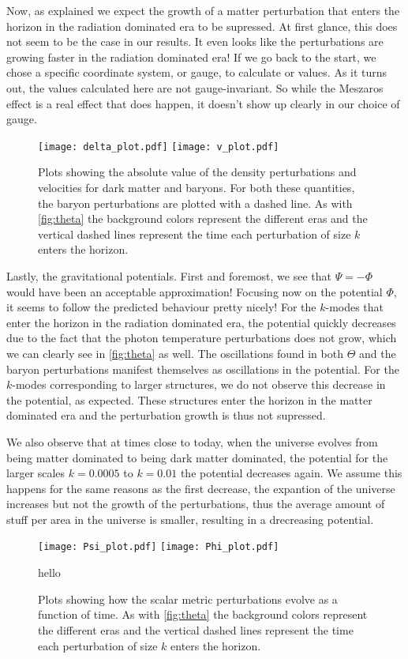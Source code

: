 \documentclass[12pt]{article}
\begin{document}
Now, as explained we expect the growth of a matter perturbation that enters the horizon in the radiation dominated era to be supressed. At first glance, this does not seem to be the case in our results. It even looks like the perturbations are growing faster in the radiation dominated era! If we go back to the start, we chose a specific coordinate system, or gauge, to calculate or values. As it turns out, the values calculated here are not gauge-invariant. So while the Meszaros effect is a real effect that does happen, it doesn't show up clearly in our choice of gauge. 

\begin{figure}[h]
    \centering
    \texttt{[image: delta\_plot.pdf]} 
    \texttt{[image: v\_plot.pdf]} 
    \caption{Plots showing the absolute value of the density perturbations and velocities for dark matter and baryons. For both these quantities, the baryon perturbations are plotted with a dashed line. As with \cref{fig:theta} the background colors represent the different eras and the vertical dashed lines represent the time each perturbation of size $k$ enters the horizon.}
    \label{fig:delta_v}
\end{figure}

Lastly, the gravitational potentials. First and foremost, we see that $\Psi = -\Phi$ would have been an acceptable approximation! Focusing now on the potential $\Phi$, it seems to follow the predicted behaviour pretty nicely! For the $k$-modes that enter the horizon in the radiation dominated era, the potential quickly decreases due to the fact that the photon temperature perturbations does not grow, which we can clearly see in \cref{fig:theta} as well. The oscillations found in both $\Theta$ and the baryon perturbations manifest themselves as oscillations in the potential. For the $k$-modes corresponding to larger structures, we do not observe this decrease in the potential, as expected. These structures enter the horizon in the matter dominated era and the perturbation growth is thus not supressed. 

We also observe that at times close to today, when the universe evolves from being matter dominated to being dark matter dominated, the potential for the larger scales $k=0.0005$ to $k=0.01$ the potential decreases again. We assume this happens for the same reasons as the first decrease, the expantion of the universe increases but not the growth of the perturbations, thus the average amount of stuff per area in the universe is smaller, resulting in a drecreasing potential.

\begin{figure}[h]
    \centering
    \texttt{[image: Psi\_plot.pdf]} 
    \texttt{[image: Phi\_plot.pdf]} 
    \caption{hello}
    \label{fig:phi_psi}
    \caption{Plots showing how the scalar metric perturbations evolve as a function of time. As with \cref{fig:theta} the background colors represent the different eras and the vertical dashed lines represent the time each perturbation of size $k$ enters the horizon.}
\end{figure}



{}

\end{document}
